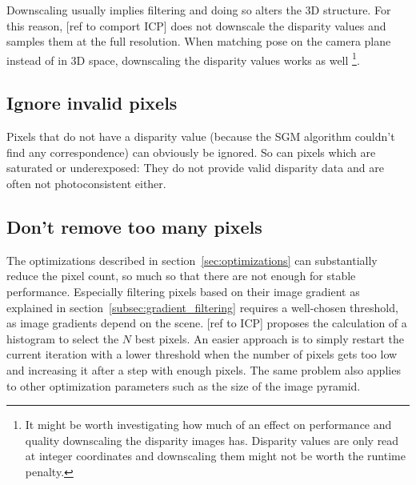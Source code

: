 Downscaling usually implies filtering and doing so alters the 3D structure. For
this reason, [ref to comport ICP] does not downscale the disparity values and
samples them at the full resolution. When matching pose on the camera plane
instead of in 3D space, downscaling the disparity values works as well
\footnote{It might be worth investigating how much of an effect on performance
and quality downscaling the disparity images has. Disparity values are only
read at integer coordinates and downscaling them might not be worth the runtime
penalty.}.

\subsection{Ignore invalid pixels}

Pixels that do not have a disparity value (because the SGM algorithm couldn't
find any correspondence) can obviously be ignored. So can pixels which are
saturated or underexposed: They do not provide valid disparity data and are
often not photoconsistent either.

\subsection{Don't remove too many pixels}

The optimizations described in section~\ref{sec:optimizations} can
substantially reduce the pixel count, so much so that there are not enough for
stable performance. Especially filtering pixels based on their image gradient
as explained in section~\ref{subsec:gradient_filtering} requires a well-chosen
threshold, as image gradients depend on the scene. [ref to ICP] proposes the
calculation of a histogram to select the $N$ best pixels. An easier approach is
to simply restart the current iteration with a lower threshold when the number
of pixels gets too low and increasing it after a step with enough pixels. The
same problem also applies to other optimization parameters such as the size of
the image pyramid.
